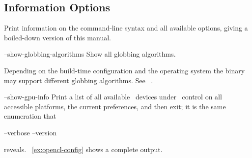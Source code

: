 

\subsection[Information Options\commonpart]{\label{sec:information-options}%
  Information Options\commonpart}

\begin{codelist}
  \label{opt:help}%
\item[\itempar{-h \\ --help}]\itemend
  Print information on the command-line syntax and all available options, giving a boiled-down
  version of this manual.


  \label{opt:show-globbing-algorithms}%
\item[--show-globbing-algorithms]\itemend
  Show all globbing algorithms.

  Depending on the build-time configuration and the operating system the binary may support
  different globbing algorithms.  See \sectionName~.


  \label{opt:show-gpu-info}%
\item[--show-gpu-info \restrictednote{\acronym{OpenCL}-enabled versions only.}]\itemend
  Print a list of all available ~devices under ~control on all
  accessible platforms, the current preferences, and then exit; it is the same enumeration that
  \begin{literal}
    \app{} --verbose --version
  \end{literal}
  reveals.  \exampleName~\ref{ex:opencl-config} shows a complete output.


\end{codelist}
